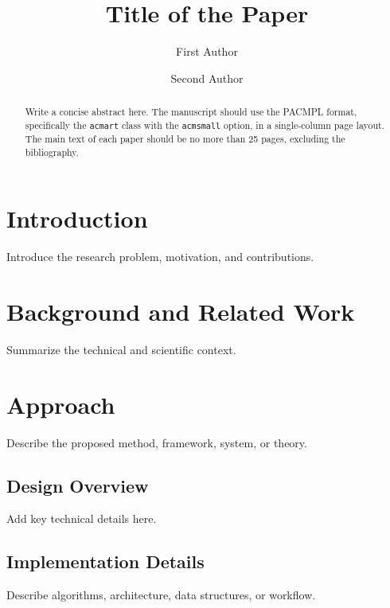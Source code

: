 \documentclass[acmsmall,review,screen]{acmart}
\begin{document}
\title{Title of the Paper}

\author{First Author}

\author{Second Author}

\begin{abstract}
Write a concise abstract here. The manuscript should use the PACMPL format, specifically
the \texttt{acmart} class with the \texttt{acmsmall} option, in a single-column page layout.
The main text of each paper should be no more than 25 pages, excluding the bibliography.
\end{abstract}


\maketitle

\section{Introduction}
Introduce the research problem, motivation, and contributions.

\section{Background and Related Work}
Summarize the technical and scientific context.

\section{Approach}
Describe the proposed method, framework, system, or theory.

\subsection{Design Overview}
Add key technical details here.

\subsection{Implementation Details}
Describe algorithms, architecture, data structures, or workflow.
\end{document}

